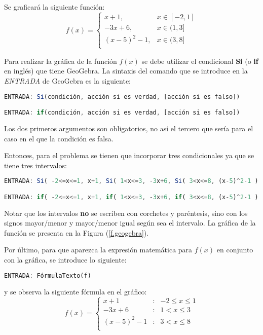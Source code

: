 Se graficará la siguiente función:
\[
f(x) = \left\{
      \begin{array}{ll}
	x+1, & x \in [-2,1] \\
	-3x+6, & x \in (1,3] \\
	(x-5)^2-1, & x \in (3,8] \\
      \end{array}
      \right.
\]

Para realizar la gráfica de la función $f(x)$ se debe utilizar el condicional
{\bf Si} (o \textbf{if} en inglés) que tiene GeoGebra. La sintaxis del comando que se
introduce en la \emph{ENTRADA} de GeoGebra es la siguiente:

\begin{lstlisting}[frame=single,language=octave,caption=\small Código a
utilizar.]
ENTRADA: Si(condición, acción si es verdad, [acción si es falso])

ENTRADA: if(condición, acción si es verdad, [acción si es falso])
\end{lstlisting}
Los dos primeros argumentos son obligatorios, no así el tercero que sería para
el caso en el que la condición es falsa.

Entonces, para el problema se tienen que incorporar tres condicionales ya que se
tiene tres intervalos:

\clearpage
\footnotesize
\begin{lstlisting}[frame=single,language=octave,caption=\small Código que se
ingresa en la \emph{ENTRADA} de GeoGebra para graficar $f(x)$.]
ENTRADA: Si( -2<=x<=1, x+1, Si( 1<x<=3, -3x+6, Si( 3<x<=8, (x-5)^2-1 ) ) )

ENTRADA: if( -2<=x<=1, x+1, if( 1<x<=3, -3x+6, if( 3<x<=8, (x-5)^2-1 ) ) )
\end{lstlisting}
\normalsize
Notar que los intervalos \textbf{no} se escriben con corchetes y paréntesis,
sino con los signos \mbox{mayor/menor} y mayor/menor igual según sea el
intervalo. La gráfica de la función se presenta en la Figura (\ref{f.geogebra}).



Por último, para que aparezca la expresión matemática para $f(x)$ en conjunto
con la gráfica, se introduce lo siguiente:
\begin{lstlisting}[frame=single,language=octave,caption=\small En caso que la 
función se llame $f$ que corresponde al objeto dentro del paréntesis.]
ENTRADA: FórmulaTexto(f) 
\end{lstlisting}
y se observa la siguiente fórmula en el gráfico:
\[
f(x) = \left\{
      \begin{array}{lcl}
	x+1 &:& -2\le x \le 1 \\
	-3x+6 &:& 1<x\le3 \\
	(x-5)^2-1 &:& 3<x\le8 \\
      \end{array}
      \right.
\]




